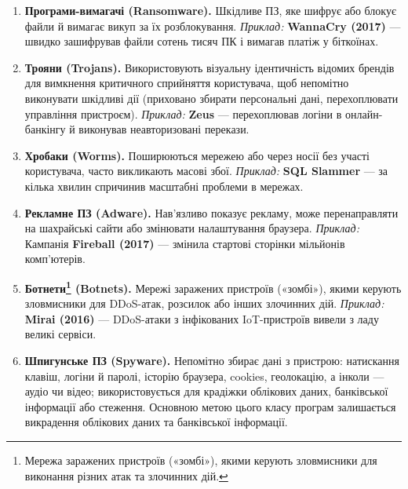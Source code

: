 \begin{enumerate}
    \item \textbf{Програми-вимагачі (Ransomware).}
    Шкідливе ПЗ, яке шифрує або блокує файли й вимагає викуп за їх розблокування.
    \newline \textit{Приклад:} \textbf{WannaCry (2017)} — швидко зашифрував файли сотень тисяч ПК і вимагав платіж у біткоїнах.  

 \newpage

    \item \textbf{Трояни (Trojans).}
    Використовують візуальну ідентичність відомих брендів для вимкнення критичного сприйняття користувача, щоб непомітно виконувати шкідливі дії (приховано збирати персональні дані, перехоплювати управління пристроєм).
    \newline \textit{Приклад:} \textbf{Zeus} — перехоплював логіни в онлайн-банкінгу й виконував неавторизовані перекази.

    \item \textbf{Хробаки (Worms).}
    Поширюються мережею або через носії без участі користувача, часто викликають масові збої.
    \newline \textit{Приклад:} \textbf{SQL Slammer} — за кілька хвилин спричинив масштабні проблеми в мережах.

    \item \textbf{Рекламне ПЗ (Adware).}
    Нав’язливо показує рекламу, може перенаправляти на шахрайські сайти або змінювати налаштування браузера.
    \newline \textit{Приклад:} Кампанія \textbf{Fireball (2017)} — змінила стартові сторінки мільйонів комп'ютерів.

    \item \textbf{Ботнети\footnote{Мережа заражених пристроїв («зомбі»), якими керують зловмисники для виконання різних атак та злочинних дій.} (Botnets).}
    Мережі заражених пристроїв («зомбі»), якими керують зловмисники для DDoS-атак, розсилок або інших злочинних дій.
    \newline \textit{Приклад:} \textbf{Mirai (2016)} — DDoS-атаки з інфікованих IoT-пристроїв вивели з ладу великі сервіси. 

    \item \textbf{Шпигунське ПЗ (Spyware).}
    Непомітно збирає дані з пристрою: натискання клавіш, логіни й паролі, історію браузера, cookies, геолокацію, а інколи — аудіо чи відео; використовується для крадіжки облікових даних, банківської інформації або стеження. Основною метою цього класу програм залишається викрадення облікових даних та банківської інформації.
    

\end{enumerate}
